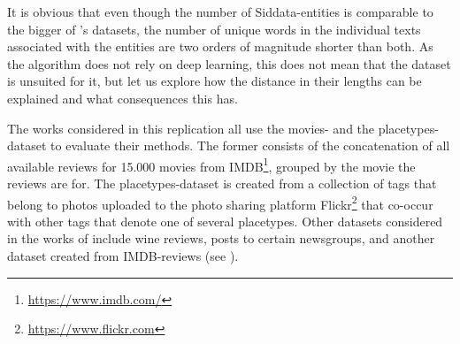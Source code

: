 \begin{table}[h]
	\centering
	\label{tab:summed_unique_words}
\end{table}

It is obvious that even though the number of Siddata-entities is comparable to the bigger of \cite{Derrac2015}'s datasets, the number of unique words in the individual texts associated with the entities are two orders of magnitude shorter than both. As the algorithm does not rely on deep learning, this does not mean that the dataset is unsuited for it, but let us explore how the distance in their lengths can be explained and what consequences this has.

The works considered in this replication \mainalgos all use the movies- and the  placetypes-dataset to evaluate their methods. The former consists of the concatenation of all available reviews for 15.000 movies from IMDB\footnote{\url{https://www.imdb.com/}}, grouped by the movie the reviews are for. The placetypes-dataset is created from a collection of tags that belong to photos uploaded to the photo sharing platform Flickr\footnote{\url{https://www.flickr.com}} that co-occur with other tags that denote one of several placetypes. Other datasets considered in the works of \mainalgos include wine reviews, posts to certain newsgroups, and another dataset created from IMDB-reviews (see ). 

